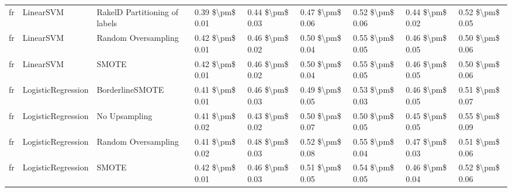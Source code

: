\begin{tabular}{lllllllll}
      fr &                       LinearSVM & RakelD Partitioning of labels & 0.39 \$\textbackslash pm\$ 0.01 &           0.44 \$\textbackslash pm\$ 0.03 &       0.47 \$\textbackslash pm\$ 0.06 &        0.52 \$\textbackslash pm\$ 0.06 &                         0.44 \$\textbackslash pm\$ 0.02 &     0.52 \$\textbackslash pm\$ 0.05 \\
      fr &                       LinearSVM &           Random Oversampling & 0.42 \$\textbackslash pm\$ 0.01 &           0.46 \$\textbackslash pm\$ 0.02 &       0.50 \$\textbackslash pm\$ 0.04 &        0.55 \$\textbackslash pm\$ 0.05 &                         0.46 \$\textbackslash pm\$ 0.05 &     0.50 \$\textbackslash pm\$ 0.06 \\
      fr &                       LinearSVM &                         SMOTE & 0.42 \$\textbackslash pm\$ 0.01 &           0.46 \$\textbackslash pm\$ 0.02 &       0.50 \$\textbackslash pm\$ 0.04 &        0.55 \$\textbackslash pm\$ 0.05 &                         0.46 \$\textbackslash pm\$ 0.05 &     0.50 \$\textbackslash pm\$ 0.06 \\
      fr &              LogisticRegression &               BorderlineSMOTE & 0.41 \$\textbackslash pm\$ 0.01 &           0.46 \$\textbackslash pm\$ 0.03 &       0.49 \$\textbackslash pm\$ 0.05 &        0.53 \$\textbackslash pm\$ 0.03 &                         0.46 \$\textbackslash pm\$ 0.05 &     0.51 \$\textbackslash pm\$ 0.07 \\
      fr &              LogisticRegression &                 No Upsampling & 0.41 \$\textbackslash pm\$ 0.02 &           0.43 \$\textbackslash pm\$ 0.02 &       0.50 \$\textbackslash pm\$ 0.07 &        0.50 \$\textbackslash pm\$ 0.05 &                         0.45 \$\textbackslash pm\$ 0.05 &     0.55 \$\textbackslash pm\$ 0.09 \\
      fr &              LogisticRegression &           Random Oversampling & 0.41 \$\textbackslash pm\$ 0.02 &           0.48 \$\textbackslash pm\$ 0.03 &       0.52 \$\textbackslash pm\$ 0.08 &        0.55 \$\textbackslash pm\$ 0.04 &                         0.47 \$\textbackslash pm\$ 0.03 &     0.51 \$\textbackslash pm\$ 0.06 \\
      fr &              LogisticRegression &                         SMOTE & 0.42 \$\textbackslash pm\$ 0.01 &           0.46 \$\textbackslash pm\$ 0.03 &       0.51 \$\textbackslash pm\$ 0.05 &        0.54 \$\textbackslash pm\$ 0.05 &                         0.46 \$\textbackslash pm\$ 0.04 &     0.52 \$\textbackslash pm\$ 0.06 \\

\end{tabular}
